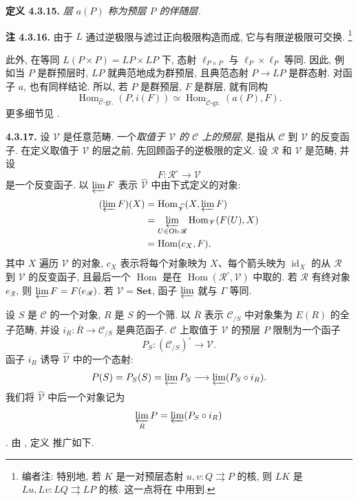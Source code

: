 \medskip
\noindent{}\textbf{定义 4.3.15.}
\textit{层 \(a(P)\) 称为预层 \(P\) 的\emph{伴随层}.}

\medskip
\noindent{}\textbf{注 4.3.16.}
由于 \(L\) 通过逆极限与滤过正向极限构造而成, 它与有限逆极限可交换.
\footnote{编者注: 特别地, 若 \(K\) 是一对预层态射
\(u,v:Q\rightrightarrows P\) 的核,
则 \(LK\) 是 \(Lu,Lv:LQ\rightrightarrows LP\) 的核.
这一点将在  中用到.}

此外, 在等同 \(L(P\times P)=LP\times LP\) 下,
态射 \(\ell_{P\times P}\) 与 \(\ell_P\times\ell_P\) 等同.
因此, 例如当 \(P\) 是群预层时, \(LP\) 就典范地成为群预层,
且典范态射 \(P\to LP\) 是群态射.
对函子 \(a\), 也有同样结论.
所以, 若 \(P\) 是群预层, \(F\) 是群层, 就有同构
\[
 \operatorname{Hom}_{\widehat{\mathscr C}\text{-gr.}}(P,i(F))
 \simeq
 \operatorname{Hom}_{\widetilde{\mathscr C}\text{-gr.}}(a(P),F).
\]
更多细节见 .

\medskip
\noindent{}\textbf{4.3.17.}
设 \(\mathscr V\) 是任意范畴.
一个\emph{取值于 \(\mathscr V\) 的 \(\mathscr C\) 上的预层},
是指从 \(\mathscr C\) 到 \(\mathscr V\) 的反变函子.
在定义取值于 \(\mathscr V\) 的层之前, 先回顾函子的逆极限的定义.
设 \(\mathscr R\) 和 \(\mathscr V\) 是范畴, 并设
\[
 F:\mathscr R^{\circ}\longrightarrow\mathscr V
\]
是一个反变函子.
以 \(\varprojlim F\) 表示 \(\widehat{\mathscr V}\) 中由下式定义的对象:
\[
 \begin{aligned}
 (\varprojlim F)(X)
 &=\operatorname{Hom}_{\widehat{\mathscr V}}
     (X,\varprojlim F)\\
 &=\varprojlim_{U\in\operatorname{Ob}\mathscr R}
     \operatorname{Hom}_{\mathscr V}(F(U),X)\\
 &=\operatorname{Hom}(c_X,F),
 \end{aligned}
\]
其中 \(X\) 遍历 \(\mathscr V\) 的对象,
\(c_X\) 表示将每个对象映为 \(X\)、每个箭头映为
\(\operatorname{id}_X\) 的从 \(\mathscr R\) 到 \(\mathscr V\) 的反变函子,
且最后一个 \(\operatorname{Hom}\) 是在
\(\operatorname{Hom}(\mathscr R^{\circ},\mathscr V)\) 中取的.
若 \(\mathscr R\) 有终对象 \(e_{\mathscr R}\), 则
\(\varprojlim F=F(e_{\mathscr R})\).
若 \(\mathscr V=\mathbf{Set}\), 函子 \(\varprojlim\) 就与 \(\Gamma\) 等同.

设 \(S\) 是 \(\mathscr C\) 的一个对象, \(R\) 是 \(S\) 的一个筛.
以 \(\overline R\) 表示 \(\mathscr C_{/S}\) 中对象集为 \(E(R)\) 的全子范畴,
并设 \(i_R:\overline R\to\mathscr C_{/S}\) 是典范函子.
\(\mathscr C\) 上取值于 \(\mathscr V\) 的预层 \(P\) 限制为一个函子
\[
 P_S:(\mathscr C_{/S})^{\circ}\longrightarrow\mathscr V.
\]
函子 \(i_R\) 诱导 \(\widehat{\mathscr V}\) 中的一个态射:
\[
 P(S)=P_S(S)=\varprojlim P_S
 \longrightarrow\varprojlim(P_S\circ i_R).
\]
我们将 \(\widehat{\mathscr V}\) 中后一个对象记为
\[
 \varprojlim_RP=\varprojlim(P_S\circ i_R)
\]
. 由 ,
定义  推广如下.

